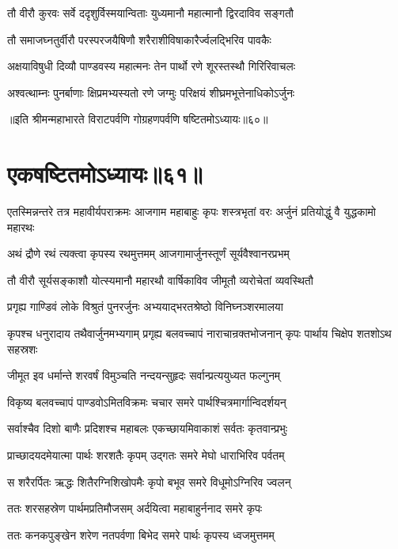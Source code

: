 \twolineshloka
{तौ वीरौ कुरवः सर्वे ददृशुर्विस्मयान्विताः}
{युध्यमानौ महात्मानौ द्विरदाविव सङ्गतौ}


\twolineshloka
{तौ समाजघ्नतुर्वीरौ परस्परजयैषिणौ}
{शरैराशीविषाकारैर्ज्वलद्भिरिव पावकैः}


\twolineshloka
{अक्षयाविषुधी दिव्यौ पाण्डवस्य महात्मनः}
{तेन पार्थो रणे शूरस्तस्थौ गिरिरिवाचलः}


\twolineshloka
{अश्वत्थाम्नः पुनर्बाणाः क्षिप्रमभ्यस्यतो रणे}
{जग्मुः परिक्षयं शीघ्रमभूत्तेनाधिकोऽर्जुनः}

॥इति श्रीमन्महाभारते विराटपर्वणि गोग्रहणपर्वणि षष्टितमोऽध्यायः॥६०॥

\chapter{एकषष्टितमोऽध्यायः॥६१॥}

\threelineshloka
{एतस्मिन्नन्तरे तत्र महावीर्यपराक्रमः}
{आजगाम महाबाहुः कृपः शस्त्रभृतां वरः}
{अर्जुनं प्रतियोद्धुं वै युद्धकामो महारथः}


\twolineshloka
{अथं द्रौणे रथं त्यक्त्वा कृपस्य रथमुत्तमम्}
{आजगामार्जुनस्तूर्णं सूर्यवैश्वानरप्रभम्}


\twolineshloka
{तौ वीरौ सूर्यसङ्काशौ योत्स्यमानौ महारथौ}
{वार्षिकाविव जीमूतौ व्यरोचेतां व्यवस्थितौ}


\twolineshloka
{प्रगृह्य गाण्डिवं लोके विश्रुतं पुनरर्जुनः}
{अभ्ययाद्भरतश्रेष्ठो विनिघ्नञ्शरमालया}


\onelineshloka
{कृपश्च धनुरादाय तथैवार्जुनमभ्यगाम्}
\twolineshloka
{प्रगृह्य बलवच्चापं नाराचान्रक्तभोजनान्}
{कृपः पार्थाय चिक्षेप शतशोऽथ सहस्रशः}


\twolineshloka
{जीमूत इव धर्मान्ते शरवर्षं विमुञ्चति}
{नन्दयन्सुहृदः सर्वान्प्रत्ययुध्यत फल्गुनम्}


\twolineshloka
{विकृष्य बलवच्चापं पाण्डवोऽमितविक्रमः}
{चचार समरे पार्थश्चित्रमार्गान्विदर्शयन्}


\twolineshloka
{सर्वाश्चैव दिशो बाणैः प्रदिशश्च महाबलः}
{एकच्छायमिवाकाशं सर्वतः कृतवान्प्रभुः}


\twolineshloka
{प्राच्छादयदमेयात्मा पार्थः शरशतैः कृपम्}
{उद्गतः समरे मेघो धाराभिरिव पर्वतम्}


\twolineshloka
{स शरैरर्पितः ऋद्धः शितैरग्निशिखोपमैः}
{कृपो बभूव समरे विधूमोऽग्निरिव ज्वलन्}


\twolineshloka
{ततः शरसहस्रेण पार्थमप्रतिमौजसम्}
{अर्दयित्वा महाबाहुर्ननाद समरे कृपः}


\twolineshloka
{ततः कनकपुङ्खेन शरेण नतपर्वणा}
{बिभेद समरे पार्थः कृपस्य ध्वजमुत्तमम्}


